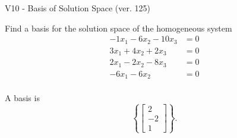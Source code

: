 \begin{exercise}
  \begin{exerciseTitle}V10 - Basis of Solution Space (ver. 125)\end{exerciseTitle}
  \begin{exerciseStatement}
    Find a basis for the solution space of the homogeneous system 
\begin{align*}
 -1 x_ 1 -6 x_ 2 -10 x_ 3 &= 0  \\ 
  3 x_ 1 + 4 x_ 2 + 2 x_ 3 &= 0  \\ 
  2 x_ 1 -2 x_ 2 -8 x_ 3 &= 0  \\ 
  -6 x_ 1 -6 x_ 2 &= 0  \\ 
 \end{align*}


 
  \end{exerciseStatement}

  \begin{exerciseAnswer}
   A basis is   
\[\left\{\left[\begin{array}{c}
2 \\
-2 \\
1
\end{array}\right]\right\}.\]

  


  \end{exerciseAnswer}
\end{exercise}